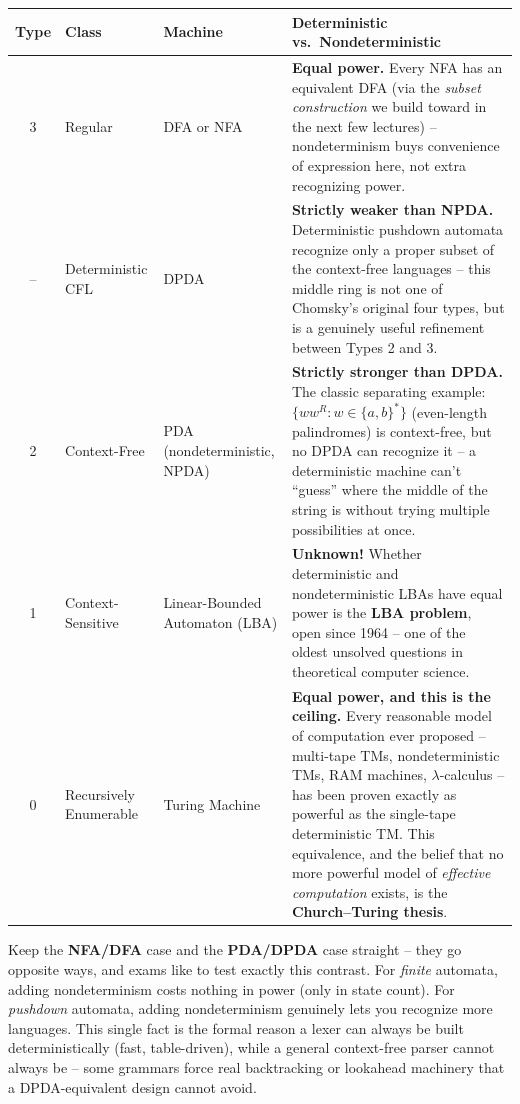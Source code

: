 \documentclass[full-course-notes.tex]{subfiles}
\begin{document}
\begin{center}
\small
\renewcommand{\arraystretch}{1.5}
\begin{tabularx}{\textwidth}{@{}c l l X@{}}
\toprule
\textbf{Type} & \textbf{Class} & \textbf{Machine} & \textbf{Deterministic vs.\ Nondeterministic} \\
\midrule
3 & Regular & DFA or NFA & \textbf{Equal power.} Every NFA has an equivalent DFA (via the
\emph{subset construction} we build toward in the next few lectures) -- nondeterminism buys
convenience of expression here, not extra recognizing power. \\
-- & Deterministic CFL & DPDA & \textbf{Strictly weaker than NPDA.} Deterministic pushdown
automata recognize only a proper subset of the context-free languages -- this middle ring is
not one of Chomsky's original four types, but is a genuinely useful refinement between Types 2
and 3. \\
2 & Context-Free & PDA (nondeterministic, NPDA) & \textbf{Strictly stronger than DPDA.} The
classic separating example: $\{ww^{R} : w \in \{a,b\}^{*}\}$ (even-length palindromes) is
context-free, but no DPDA can recognize it -- a deterministic machine can't ``guess'' where the
middle of the string is without trying multiple possibilities at once. \\
1 & Context-Sensitive & Linear-Bounded Automaton (LBA) & \textbf{Unknown!} Whether
deterministic and nondeterministic LBAs have equal power is the \textbf{LBA problem}, open
since 1964 -- one of the oldest unsolved questions in theoretical computer science. \\
0 & Recursively Enumerable & Turing Machine & \textbf{Equal power, and this is the ceiling.}
Every reasonable model of computation ever proposed -- multi-tape TMs, nondeterministic TMs,
RAM machines, $\lambda$-calculus -- has been proven exactly as powerful as the single-tape
deterministic TM. This equivalence, and the belief that no more powerful model of
\emph{effective computation} exists, is the \textbf{Church--Turing thesis}. \\
\bottomrule
\end{tabularx}
\end{center}

\begin{examfocus}
Keep the \textbf{NFA/DFA} case and the \textbf{PDA/DPDA} case straight -- they go opposite
ways, and exams like to test exactly this contrast. For \emph{finite} automata, adding
nondeterminism costs nothing in power (only in state count). For \emph{pushdown} automata,
adding nondeterminism genuinely lets you recognize more languages. This single fact is the
formal reason a lexer can always be built deterministically (fast, table-driven), while a
general context-free parser cannot always be -- some grammars force real backtracking or lookahead
machinery that a DPDA-equivalent design cannot avoid.
\end{examfocus}
\end{document}
